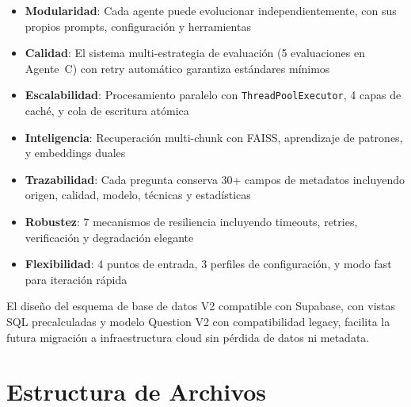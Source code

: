 \documentclass[10pt,twocolumn,letterpaper]{article}
\begin{document}
\begin{itemize}[nosep,leftmargin=*]
  \item \textbf{Modularidad}: Cada agente puede evolucionar independientemente,
        con sus propios prompts, configuraci\'on y herramientas
  \item \textbf{Calidad}: El sistema multi-estrategia de evaluaci\'on (5 evaluaciones
        en Agente~C) con retry autom\'atico garantiza est\'andares m\'inimos
  \item \textbf{Escalabilidad}: Procesamiento paralelo con \texttt{ThreadPoolExecutor},
        4 capas de cach\'e, y cola de escritura at\'omica
  \item \textbf{Inteligencia}: Recuperaci\'on multi-chunk con FAISS, aprendizaje
        de patrones, y embeddings duales
  \item \textbf{Trazabilidad}: Cada pregunta conserva 30+ campos de metadatos
        incluyendo origen, calidad, modelo, t\'ecnicas y estad\'isticas
  \item \textbf{Robustez}: 7 mecanismos de resiliencia incluyendo timeouts,
        retries, verificaci\'on y degradaci\'on elegante
  \item \textbf{Flexibilidad}: 4 puntos de entrada, 3 perfiles de configuraci\'on,
        y modo fast para iteraci\'on r\'apida
\end{itemize}

El dise\~no del esquema de base de datos V2 compatible con Supabase, con vistas SQL
precalculadas y modelo Question V2 con compatibilidad legacy, facilita la
futura migraci\'on a infraestructura cloud sin p\'erdida de datos ni metadata.

\appendix
\section{Estructura de Archivos}
\end{document}
